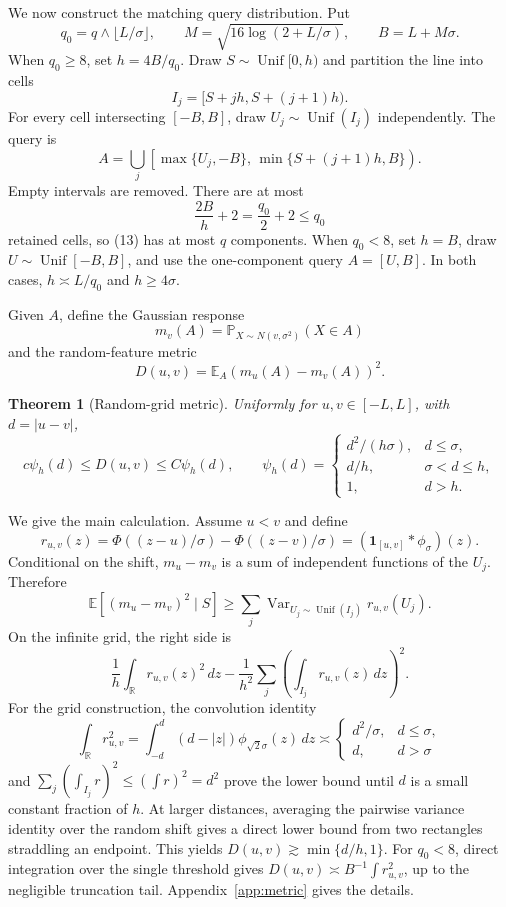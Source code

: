 \documentclass{article}
\newtheorem{theorem}{Theorem}
\theoremstyle{definition}
\theoremstyle{remark}
\newcommand{\E}{\mathbb E}
\newcommand{\Prb}{\mathbb P}
\newcommand{\R}{\mathbb R}
\newcommand{\1}{\mathbf 1}
\begin{document}
We now construct the matching query distribution. Put \[ q_0=q\wedge\lfloor L/\sigma\rfloor,\qquad M=\sqrt{16\log(2+L/\sigma)},\qquad B=L+M\sigma. \] When \(q_0\geq8\), set \(h=4B/q_0\). Draw \(S\sim\operatorname{Unif}[0,h)\) and partition the line into cells \[ I_j=[S+jh,S+(j+1)h). \] For every cell intersecting \([-B,B]\), draw \(U_j\sim\operatorname{Unif}(I_j)\) independently. The query is \[ A=\bigcup_j \left[\max\{U_j,-B\},\, \min\{S+(j+1)h,B\}\right). \tag{13} \] Empty intervals are removed. There are at most \[ \frac{2B}{h}+2=\frac{q_0}{2}+2\leq q_0 \] retained cells, so (13) has at most \(q\) components. When \(q_0<8\), set \(h=B\), draw \(U\sim\operatorname{Unif}[-B,B]\), and use the one-component query \(A=[U,B]\). In both cases, \(h\asymp L/q_0\) and \(h\geq4\sigma\).

Given \(A\), define the Gaussian response \[ m_v(A)=\Prb_{X\sim N(v,\sigma^2)}(X\in A) \] and the random-feature metric \[ D(u,v)=\E_A(m_u(A)-m_v(A))^2. \]

\begin{theorem}[Random-grid metric]\label{thm:metric}
Uniformly for \(u,v\in[-L,L]\), with \(d=|u-v|\), \[ c\psi_h(d)\leq D(u,v)\leq C\psi_h(d), \qquad \psi_h(d)=
\begin{cases}
d^2/(h\sigma),&d\leq\sigma,\\
d/h,&\sigma<d\leq h,\\
1,&d>h.
\end{cases}
\tag{14} \]
\end{theorem}

We give the main calculation. Assume \(u<v\) and define \[ r_{u,v}(z)= \Phi((z-u)/\sigma)-\Phi((z-v)/\sigma) =(\1_{[u,v]}*\phi_\sigma)(z). \] Conditional on the shift, \(m_u-m_v\) is a sum of independent functions of the \(U_j\). Therefore \[ \E[(m_u-m_v)^2\mid S] \geq \sum_j\operatorname{Var}_{U_j\sim\operatorname{Unif}(I_j)}r_{u,v}(U_j). \tag{15} \] On the infinite grid, the right side is \[ \frac1h\int_\R r_{u,v}(z)^2\,dz - \frac1{h^2}\sum_j\left(\int_{I_j}r_{u,v}(z)\,dz\right)^2. \tag{16} \] For the grid construction, the convolution identity \[ \int_\R r_{u,v}^2 =\int_{-d}^d(d-|z|)\phi_{\sqrt2\sigma}(z)\,dz \asymp
\begin{cases}
d^2/\sigma,&d\leq\sigma,\\
d,&d>\sigma
\end{cases}
\tag{17} \] and \(\sum_j(\int_{I_j}r)^2\leq(\int r)^2=d^2\) prove the lower bound until \(d\) is a small constant fraction of \(h\). At larger distances, averaging the pairwise variance identity over the random shift gives a direct lower bound from two rectangles straddling an endpoint. This yields \(D(u,v)\gtrsim\min\{d/h,1\}\). For \(q_0<8\), direct integration over the single threshold gives \(D(u,v)\asymp B^{-1}\int r_{u,v}^2\), up to the negligible truncation tail. Appendix~\ref{app:metric} gives the details.
\end{document}
